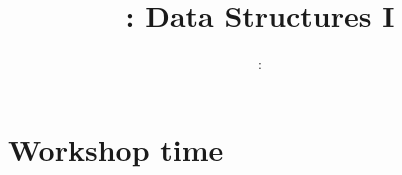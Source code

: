 \usepackage{../../beamerthemeFalmouthGamesAcademy}
\usepackage{multimedia}
\graphicspath{ {../../} }

\lstset{language=[Sharp]C
}

\usepackage[normalem]{ulem}
\usepackage{wasysym}

\usepackage{algpseudocode}

\usepackage{pdfpages}
\usepackage{qtree}

\usetikzlibrary{arrows,automata}
\usetikzlibrary{tikzmark,calc}




\title{\sessionnumber: Data Structures I}
\subtitle{\modulecode: \moduletitle}

\frame{\titlepage} 





%
%
%

\part{Workshop time}
\frame{\partpage}

